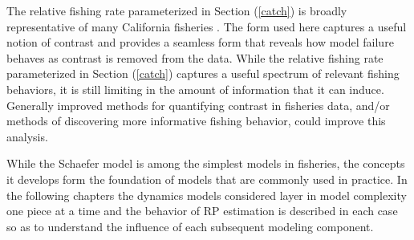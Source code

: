 %

%
The relative fishing rate parameterized in Section (\ref{catch}) is broadly 
representative of many California fisheries \cite{pearson_effectiveness_1995, pearson_reliability_2008}. 
The form used here captures a useful notion of contrast and provides a seamless 
form that reveals how model failure behaves as contrast is removed from the 
data. 
%
While the relative fishing rate parameterized in Section (\ref{catch}) captures a useful
spectrum of relevant fishing behaviors, it is still limiting in the amount of information
that it can induce.
Generally improved methods for quantifying contrast in fisheries 
data, and/or methods of discovering more informative fishing behavior, could 
improve this analysis.

%
While the Schaefer model is among the simplest models in fisheries, the concepts 
it develops form the foundation of models that are commonly used in practice. 
In the following chapters the dynamics models considered layer in model 
complexity one piece at a time and the behavior of RP estimation is described 
in each case so as to understand the influence of each subsequent modeling 
component. 

